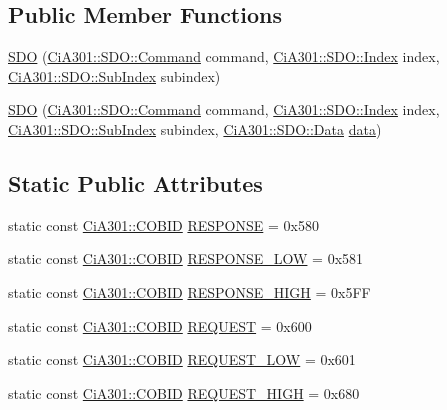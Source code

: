 \subsection*{Public Member Functions}
\begin{DoxyCompactItemize}
\item 
\hyperlink{struct_ci_a301_1_1_s_d_o_a09379dd0f7a4c0b497236700e743de91}{S\-D\-O} (\hyperlink{struct_ci_a301_1_1_s_d_o_a775f3ad0c6ad9894efd23092a37906ea}{Ci\-A301\-::\-S\-D\-O\-::\-Command} command, \hyperlink{struct_ci_a301_1_1_s_d_o_a23ec0bef652b1fad0123ec3bed770852}{Ci\-A301\-::\-S\-D\-O\-::\-Index} index, \hyperlink{struct_ci_a301_1_1_s_d_o_add21496adb09c6f74c8f725c17ec116a}{Ci\-A301\-::\-S\-D\-O\-::\-Sub\-Index} subindex)
\item 
\hyperlink{struct_ci_a301_1_1_s_d_o_a08b5da65e44b07de85a73158e8a52ed6}{S\-D\-O} (\hyperlink{struct_ci_a301_1_1_s_d_o_a775f3ad0c6ad9894efd23092a37906ea}{Ci\-A301\-::\-S\-D\-O\-::\-Command} command, \hyperlink{struct_ci_a301_1_1_s_d_o_a23ec0bef652b1fad0123ec3bed770852}{Ci\-A301\-::\-S\-D\-O\-::\-Index} index, \hyperlink{struct_ci_a301_1_1_s_d_o_add21496adb09c6f74c8f725c17ec116a}{Ci\-A301\-::\-S\-D\-O\-::\-Sub\-Index} subindex, \hyperlink{struct_ci_a301_1_1_s_d_o_a8224c82a3130510d9cdb8ae739de624b}{Ci\-A301\-::\-S\-D\-O\-::\-Data} \hyperlink{struct_ci_a301_1_1_object_a73870d74c7ffaaf07515bf4a5d5330ea}{data})
\end{DoxyCompactItemize}
\subsection*{Static Public Attributes}
\begin{DoxyCompactItemize}
\item 
static const \hyperlink{namespace_ci_a301_aec5b5dbb2b60d2837c60499f6f297aa7}{Ci\-A301\-::\-C\-O\-B\-I\-D} \hyperlink{struct_ci_a301_1_1_s_d_o_a07a9b6fd21e38720d34acd0ad570f405}{R\-E\-S\-P\-O\-N\-S\-E} = 0x580
\item 
static const \hyperlink{namespace_ci_a301_aec5b5dbb2b60d2837c60499f6f297aa7}{Ci\-A301\-::\-C\-O\-B\-I\-D} \hyperlink{struct_ci_a301_1_1_s_d_o_a4d1cfd74034335f16b43a11f8e804029}{R\-E\-S\-P\-O\-N\-S\-E\-\_\-\-L\-O\-W} = 0x581
\item 
static const \hyperlink{namespace_ci_a301_aec5b5dbb2b60d2837c60499f6f297aa7}{Ci\-A301\-::\-C\-O\-B\-I\-D} \hyperlink{struct_ci_a301_1_1_s_d_o_aef5fb9c8aa9d87537b049f57fe4bcd53}{R\-E\-S\-P\-O\-N\-S\-E\-\_\-\-H\-I\-G\-H} = 0x5\-F\-F
\item 
static const \hyperlink{namespace_ci_a301_aec5b5dbb2b60d2837c60499f6f297aa7}{Ci\-A301\-::\-C\-O\-B\-I\-D} \hyperlink{struct_ci_a301_1_1_s_d_o_afffb267d48f6130ca06a8ad461d52e4f}{R\-E\-Q\-U\-E\-S\-T} = 0x600
\item 
static const \hyperlink{namespace_ci_a301_aec5b5dbb2b60d2837c60499f6f297aa7}{Ci\-A301\-::\-C\-O\-B\-I\-D} \hyperlink{struct_ci_a301_1_1_s_d_o_ab64717b4ca5b6da42af0599ef2ce4b8e}{R\-E\-Q\-U\-E\-S\-T\-\_\-\-L\-O\-W} = 0x601
\item 
static const \hyperlink{namespace_ci_a301_aec5b5dbb2b60d2837c60499f6f297aa7}{Ci\-A301\-::\-C\-O\-B\-I\-D} \hyperlink{struct_ci_a301_1_1_s_d_o_a80d1d78a40a173a165cb66b9101d25f1}{R\-E\-Q\-U\-E\-S\-T\-\_\-\-H\-I\-G\-H} = 0x680
\end{DoxyCompactItemize}
